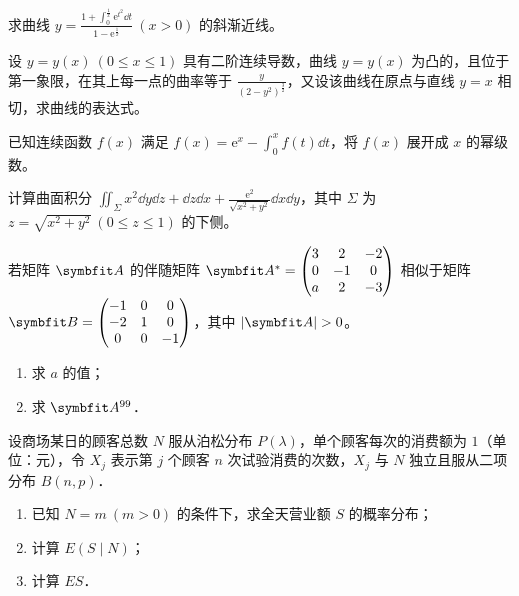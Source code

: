 \begin{question}[index=17,points=10]
求曲线 $\displaystyle y=\frac{1+\displaystyle\int_0^{\frac1x}\mathrm e^{t^2}\dd t}
{1-\mathrm e^{\frac1x}}\ (x>0)$ 的斜渐近线。
\end{question}
\QuestionBreak\WorkSpace

\begin{question}[index=18,points=12]
设 $y=y(x)\ (0\leq x\leq1)$ 具有二阶连续导数，曲线 $y=y(x)$ 为凸的，且位于第一象限，在其上每一点的曲率等于
$\displaystyle\frac{y}{(2-y^2)^{\frac32}}$，又设该曲线在原点与直线 $y=x$ 相切，求曲线的表达式。
\end{question}
\QuestionBreak\WorkSpace\WorkPageBreak

\begin{question}[index=19,points=12]
已知连续函数 $f(x)$ 满足 $\displaystyle f(x)=\mathrm e^x-\int_0^x f(t)\dd t$，将 $f(x)$ 展开成 $x$ 的幂级数。
\end{question}
\QuestionBreak\WorkSpace

\begin{question}[index=20,points=12]
计算曲面积分 $\displaystyle\iint_\Sigma x^2\dd y\dd z+\dd z\dd x+
\frac{\mathrm e^2}{\sqrt{x^2+y^2}}\dd x\dd y$，其中 $\Sigma$ 为 $z=\sqrt{x^2+y^2}\ (0\leq z\leq1)$ 的下侧。
\end{question}
\QuestionBreak\WorkSpace\WorkPageBreak

\begin{question}[index=21,points=12]
若矩阵 $\symbfit A$ 的伴随矩阵
$\symbfit A^*=\begin{pmatrix}3&2&-2\\0&-1&0\\a&2&-3\end{pmatrix}$
相似于矩阵 $\symbfit B=\begin{pmatrix}-1&0&0\\-2&1&0\\0&0&-1\end{pmatrix}$，其中 $|\symbfit A|>0$。
\begin{enumerate}[label=（\arabic*）,leftmargin=2.5em,labelsep=.4em,itemsep=3pt,topsep=3pt]
\item 求 $a$ 的值；
\item 求 $\symbfit A^{99}$．
\end{enumerate}
\end{question}
\QuestionBreak\WorkSpace

\begin{question}[index=22,points=12]
设商场某日的顾客总数 $N$ 服从泊松分布 $P(\lambda)$，单个顾客每次的消费额为 $1$（单位：元），令 $X_j$ 表示第 $j$ 个顾客 $n$ 次试验消费的次数，$X_j$ 与 $N$ 独立且服从二项分布 $B(n,p)$．
\begin{enumerate}[label=（\arabic*）,leftmargin=2.5em,labelsep=.4em,itemsep=3pt,topsep=3pt]
\item 已知 $N=m\ (m>0)$ 的条件下，求全天营业额 $S$ 的概率分布；
\item 计算 $E(S\mid N)$；
\item 计算 $ES$．
\end{enumerate}
\end{question}
\WorkSpace
